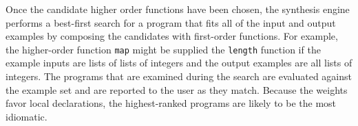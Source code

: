 Once the candidate higher order functions have been chosen, the synthesis engine performs a best-first search for a program that fits all of the input and output examples by composing the candidates with first-order functions. For example, the higher-order function \texttt{map} might be supplied the \texttt{length} function if the example inputs are lists of lists of integers and the output examples are all lists of integers. The programs that are examined during the search are evaluated against the example set and are reported to the user as they match. Because the weights favor local declarations, the highest-ranked programs are likely to be the most idiomatic.